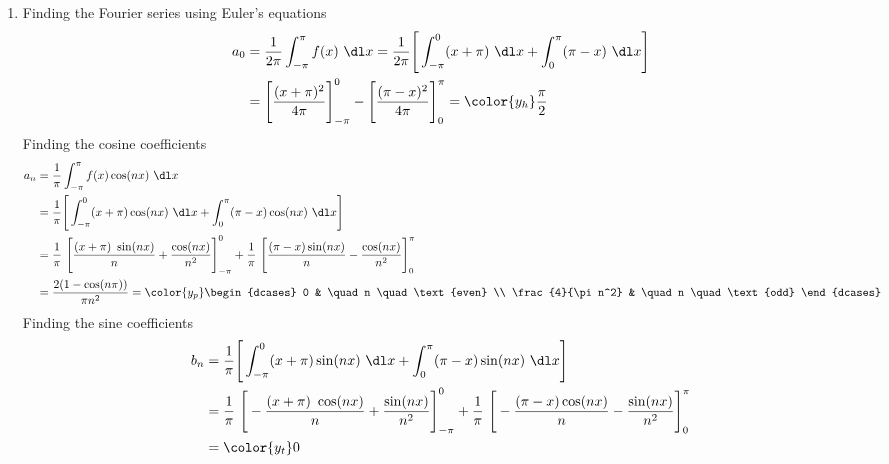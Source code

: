 \begin{enumerate}
    \item Finding the Fourier series using Euler's equations
          \begin{align}
              a_0 & = \frac{1}{2\pi} \int_{-\pi}^{\pi} f(x)\ \dl x
              = \frac{1}{2\pi} \Bigg[\int_{-\pi}^{0} (x + \pi)\ \dl x
              +  \int_{0}^{\pi} (\pi - x)\ \dl x\Bigg]                \\
                  & = \Bigg[ \frac{(x + \pi)^2}{4\pi} \Bigg]_{-\pi}^0
              - \Bigg[ \frac{(\pi - x)^2}{4\pi} \Bigg]_0^{\pi}
              = \color{y_h} \frac{\pi}{2}
          \end{align}
          Finding the cosine coefficients
          \begin{align}
              a_n & = \frac{1}{\pi} \int_{-\pi}^{\pi} f(x) \cos(nx)\ \dl x          \\
                  & = \frac{1}{\pi} \Bigg[\int_{-\pi}^{0} (x + \pi) \cos(nx)\ \dl x
              +  \int_{0}^{\pi} (\pi - x) \cos(nx)\ \dl x\Bigg]                     \\
                  & = \frac{1}{\pi}\ \Bigg[ \frac{(x + \pi)\ \sin(nx)}{n}
                  + \frac{\cos(nx)}{n^2} \Bigg]_{-\pi}^{0}
              + \frac{1}{\pi}\ \Bigg[\frac{(\pi - x) \sin(nx)}{n}
              - \frac{\cos(nx)}{n^2} \Bigg]_0^{\pi}                                 \\
                  & = \frac{2(1 - \cos(n\pi))}{\pi n^2}
              = \color{y_p} \begin{dcases}
                                0                 & \quad n \quad \text{even} \\
                                \frac{4}{\pi n^2} & \quad n \quad \text{odd}
                            \end{dcases}
          \end{align}
          Finding the sine coefficients
          \begin{align}
              b_n & = \frac{1}{\pi} \Bigg[\int_{-\pi}^{0} (x + \pi) \sin(nx)\ \dl x
              +  \int_{0}^{\pi} (\pi - x) \sin(nx)\ \dl x\Bigg]                     \\
                  & = \frac{1}{\pi}\ \Bigg[ -\frac{(x + \pi)\ \cos(nx)}{n}
                  + \frac{\sin(nx)}{n^2} \Bigg]_{-\pi}^{0}
              + \frac{1}{\pi}\ \Bigg[-\frac{(\pi - x) \cos(nx)}{n}
              - \frac{\sin(nx)}{n^2} \Bigg]_{0}^{\pi}                               \\
                  & = \color{y_t} 0
          \end{align}

\end{enumerate}
